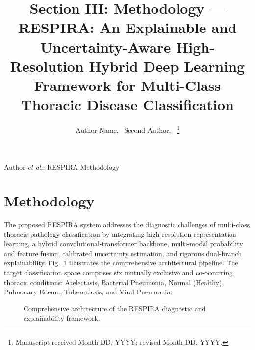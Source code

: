 \documentclass[journal]{IEEEtran}
\begin{document}
\title{Section III: Methodology --- RESPIRA: An Explainable and Uncertainty-Aware High-Resolution Hybrid Deep Learning Framework for Multi-Class Thoracic Disease Classification}

\author{Author Name,~
        Second Author,~
\thanks{Manuscript received Month DD, YYYY; revised Month DD, YYYY.}
}

%
{Author \MakeLowercase{\textit{et al.}}: RESPIRA Methodology}

\maketitle

\section{Methodology}
\label{sec:methodology}

The proposed RESPIRA system addresses the diagnostic challenges of multi-class thoracic pathology classification by integrating high-resolution representation learning, a hybrid convolutional-transformer backbone, multi-modal probability and feature fusion, calibrated uncertainty estimation, and rigorous dual-branch explainability. Fig.~\ref{fig:overall_architecture} illustrates the comprehensive architectural pipeline. The target classification space comprises six mutually exclusive and co-occurring thoracic conditions: Atelectasis, Bacterial Pneumonia, Normal (Healthy), Pulmonary Edema, Tuberculosis, and Viral Pneumonia.

\begin{figure}[!t]
\centering
{}
\caption{Comprehensive architecture of the RESPIRA diagnostic and explainability framework.}
\label{fig:overall_architecture}
\end{figure}
\end{document}
